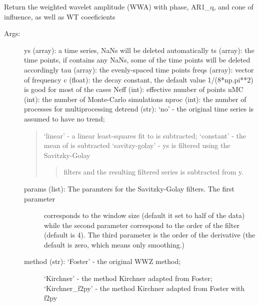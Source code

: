 \documentclass[letterpaper,10pt,english]{sphinxmanual}
\begin{document}
\begin{fulllineitems}
\label{\detokenize{Spectral:pyleoclim.Spectral.wwz}}
Return the weighted wavelet amplitude (WWA) with phase, AR1\_q, and cone of influence, as well as WT coeeficients
\begin{description}
\item[{Args:}] \leavevmode
ys (array): a time series, NaNs will be deleted automatically
ts (array): the time points, if  contains any NaNs, some of the time points will be deleted accordingly
tau (array): the evenly-spaced time points
freqs (array): vector of frequency
c (float): the decay constant, the default value 1/(8*np.pi**2) is good for most of the cases
Neff (int): effective number of points
nMC (int): the number of Monte-Carlo simulations
nproc (int): the number of processes for multiprocessing
detrend (str): ‘no’ - the original time series is assumed to have no trend;
\begin{quote}

‘linear’ - a linear least-squares fit to  is subtracted;
‘constant’ - the mean of  is subtracted
‘savitzy-golay’ - ys is filtered using the Savitzky-Golay
\begin{quote}

filters and the resulting filtered series is subtracted from y.
\end{quote}
\end{quote}
\begin{description}
\item[{params (list): The paramters for the Savitzky-Golay filters. The first parameter}] \leavevmode
corresponds to the window size (default it set to half of the data)
while the second parameter correspond to the order of the filter
(default is 4). The third parameter is the order of the derivative
(the default is zero, which means only smoothing.)

\item[{method (str): ‘Foster’ - the original WWZ method;}] \leavevmode
‘Kirchner’ - the method Kirchner adapted from Foster;
‘Kirchner\_f2py’ - the method Kirchner adapted from Foster with f2py


\end{description}
\end{description}
\end{fulllineitems}
\end{document}
